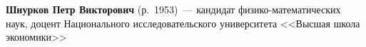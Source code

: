 \begin{multicols}{2}
\vspace*{3pt}

\noindent
\textbf{Шнурков Петр Викторович} (р.\ 1953)~--- 
кандидат фи\-зи\-ко-ма\-те\-ма\-ти\-че\-ских наук, доцент Национального 
исследовательского университета <<Высшая школа экономики>>


 



 \label{end\stat}






\end{multicols}

\newpage